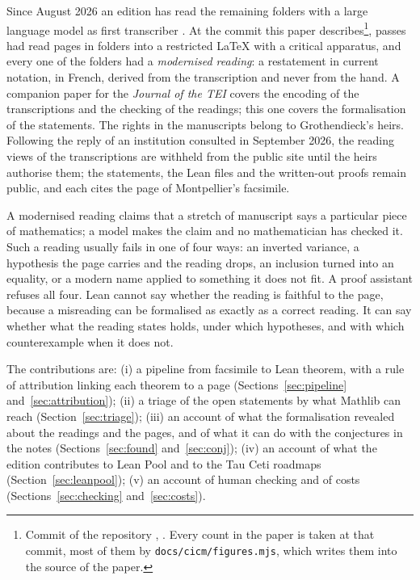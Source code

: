 \documentclass[runningheads,a4paper]{llncs}
\begin{document}
Since August 2026 an edition has read the remaining folders with a large language model as first transcriber \cite{huajtei,repo}. At the commit this paper describes\footnote{Commit \cntSnapshot{} of the repository \cite{repo}, \cntSnapshotDate. Every count in the paper is taken at that commit, most of them by \texttt{docs/cicm/figures.mjs}, which writes them into the source of the paper.}, \cntBatches{} passes had read \cntPages{} pages in \cntHandFolders{} folders into a restricted \LaTeX{} with a critical apparatus, and every one of the \cntHandFolders{} folders had a \emph{modernised reading}: a restatement in current notation, in French, derived from the transcription and never from the hand. A companion paper for the \emph{Journal of the TEI} \cite{huajtei} covers the encoding of the transcriptions and the checking of the readings; this one covers the formalisation of the statements. The rights in the manuscripts belong to Grothendieck's heirs. Following the reply of an institution consulted in September 2026, the reading views of the transcriptions are withheld from the public site until the heirs authorise them; the statements, the Lean files and the written-out proofs remain public, and each cites the page of Montpellier's facsimile.

A modernised reading claims that a stretch of manuscript says a particular piece of mathematics; a model makes the claim and no mathematician has checked it. Such a reading usually fails in one of four ways: an inverted variance, a hypothesis the page carries and the reading drops, an inclusion turned into an equality, or a modern name applied to something it does not fit. A proof assistant refuses all four. Lean cannot say whether the reading is faithful to the page, because a misreading can be formalised as exactly as a correct reading. It can say whether what the reading states holds, under which hypotheses, and with which counterexample when it does not.

The contributions are: (i) a pipeline from facsimile to Lean theorem, with a rule of attribution linking each theorem to a page (Sections~\ref{sec:pipeline} and~\ref{sec:attribution}); (ii) a triage of the open statements by what Mathlib can reach (Section~\ref{sec:triage}); (iii) an account of what the formalisation revealed about the readings and the pages, and of what it can do with the conjectures in the notes (Sections~\ref{sec:found} and~\ref{sec:conj}); (iv) an account of what the edition contributes to Lean Pool and to the Tau Ceti roadmaps (Section~\ref{sec:leanpool}); (v) an account of human checking and of costs (Sections~\ref{sec:checking} and~\ref{sec:costs}).
\end{document}
